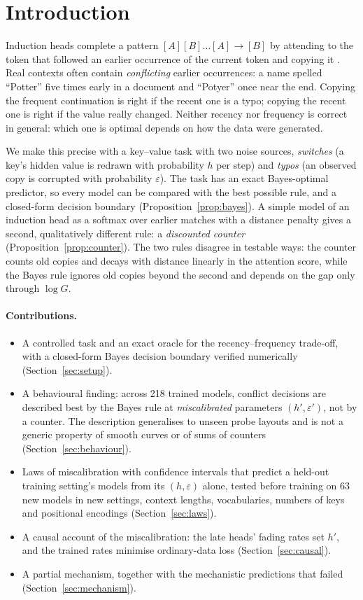 \documentclass[11pt]{article}
\newcommand{\hp}{h'}
\newcommand{\ep}{\varepsilon'}
\begin{document}
\section{Introduction}

Induction heads complete a pattern $[A][B]\dots[A] \to [B]$ by attending to the token that followed an earlier occurrence of the current token and copying it \citep{elhage2021mathematical,olsson2022context}. Real contexts often contain \emph{conflicting} earlier occurrences: a name spelled ``Potter'' five times early in a document and ``Potyer'' once near the end. Copying the frequent continuation is right if the recent one is a typo; copying the recent one is right if the value really changed. Neither recency nor frequency is correct in general: which one is optimal depends on how the data were generated.

We make this precise with a key--value task with two noise sources, \emph{switches} (a key's hidden value is redrawn with probability $h$ per step) and \emph{typos} (an observed copy is corrupted with probability $\varepsilon$). The task has an exact Bayes-optimal predictor, so every model can be compared with the best possible rule, and a closed-form decision boundary (Proposition~\ref{prop:bayes}). A simple model of an induction head as a softmax over earlier matches with a distance penalty gives a second, qualitatively different rule: a \emph{discounted counter} (Proposition~\ref{prop:counter}). The two rules disagree in testable ways: the counter counts old copies and decays with distance linearly in the attention score, while the Bayes rule ignores old copies beyond the second and depends on the gap only through $\log G$.

\paragraph{Contributions.}
\begin{itemize}
\item A controlled task and an exact oracle for the recency--frequency trade-off, with a closed-form Bayes decision boundary verified numerically (Section~\ref{sec:setup}).
\item A behavioural finding: across 218 trained models, conflict decisions are described best by the Bayes rule at \emph{miscalibrated} parameters $(\hp,\ep)$, not by a counter. The description generalises to unseen probe layouts and is not a generic property of smooth curves or of sums of counters (Section~\ref{sec:behaviour}).
\item Laws of miscalibration with confidence intervals that predict a held-out training setting's models from its $(h,\varepsilon)$ alone, tested before training on 63 new models in new settings, context lengths, vocabularies, numbers of keys and positional encodings (Section~\ref{sec:laws}).
\item A causal account of the miscalibration: the late heads' fading rates set $\hp$, and the trained rates minimise ordinary-data loss (Section~\ref{sec:causal}).
\item A partial mechanism, together with the mechanistic predictions that failed (Section~\ref{sec:mechanism}).
\end{itemize}
\end{document}
